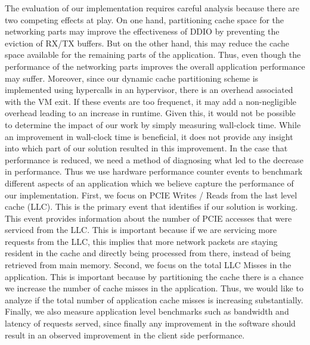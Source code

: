 \documentclass[sigconf,authorversion,noacm]{acmart}
\begin{document}
The evaluation of our implementation requires careful analysis because there are
two competing effects at play. On one hand, partitioning cache space for the
networking parts may improve the effectiveness of DDIO by preventing the
eviction of RX/TX buffers. But on the other hand, this may reduce the cache
space available for the remaining parts of the application. Thus, even though
the performance of the networking parts improves the overall application
performance may suffer. Moreover, since our dynamic cache partitioning scheme is
implemented using hypercalls in an hypervisor, there is an overhead associated
with the VM exit. If these events are too frequenct, it may add a
non-negligible overhead leading to an increase in runtime. Given this, it would
not be possible to determine the impact of our work by simply measuring
wall-clock time. While an improvement in wall-clock time is beneficial, it does
not provide any insight into which part of our solution resulted in this
improvement. In the case that performance is reduced, we need a method of
diagnosing what led to the decrease in performance. Thus we use hardware
performance counter events to benchmark different aspects of an application
which we believe capture the performance of our implementation. First, we focus
on PCIE Writes / Reads from the last level cache (LLC). This is the primary
event that identifies if our solution is working. This event provides
information about the number of PCIE accesses that were serviced from the LLC.
This is important because if we are servicing more requests from the LLC, this
implies that more network packets are staying resident in the cache and directly
being processed from there, instead of being retrieved from main memory. Second,
we focus on the total LLC Misses in the application. This is important because
by partitioning the cache there is a chance we increase the number of cache
misses in the application. Thus, we would like to analyze if the total number of
application cache misses is increasing substantially. Finally, we also measure
application level benchmarks such as bandwidth and latency of requests served,
since finally any improvement in the software should result in an observed
improvement in the client side performance.
\end{document}
